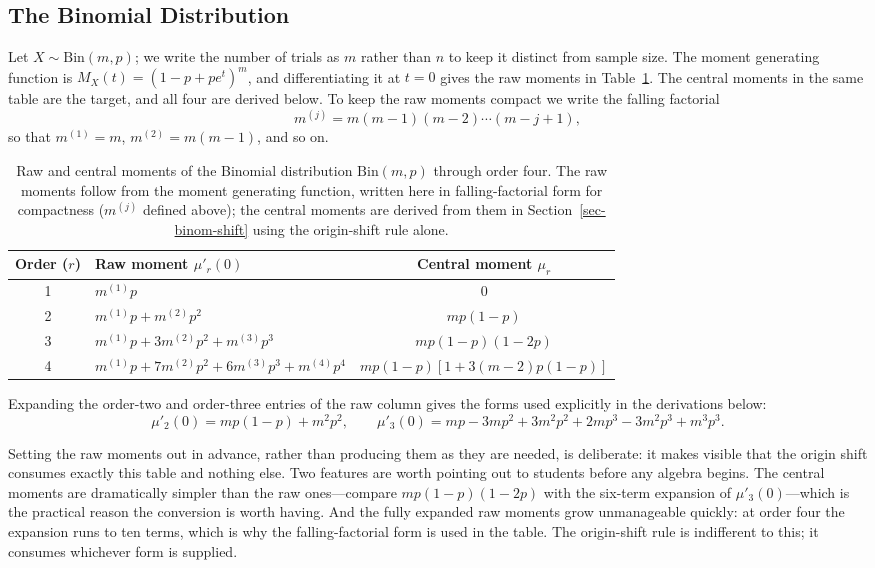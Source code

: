 \documentclass[
  12pt]{article}
\begin{document}
\subsection{The Binomial Distribution}

Let $X \sim \text{Bin}(m, p)$; we write the number of trials as $m$ rather than $n$ to keep it distinct from sample size. The moment generating function is $M_X(t) = \left(1 - p + p e^t\right)^m$, and differentiating it at $t = 0$ gives the raw moments in Table~\ref{tab:binom}. The central moments in the same table are the target, and all four are derived below. To keep the raw moments compact we write the falling factorial
\[
m^{(j)} = m(m-1)(m-2)\cdots(m-j+1),
\]
so that $m^{(1)} = m$, $m^{(2)} = m(m-1)$, and so on.

\begin{table}[htbp]
\centering
\small
\begin{tabular}{@{}clc@{}}
\toprule
Order ($r$) & Raw moment $\mu'_r(0)$ & Central moment $\mu_r$ \\
\midrule
1 & $m^{(1)}p$ & $0$ \\
2 & $m^{(1)}p + m^{(2)}p^2$ & $mp(1-p)$ \\
3 & $m^{(1)}p + 3m^{(2)}p^2 + m^{(3)}p^3$ & $mp(1-p)(1-2p)$ \\
4 & $m^{(1)}p + 7m^{(2)}p^2 + 6m^{(3)}p^3 + m^{(4)}p^4$ & $mp(1-p)\left[1 + 3(m-2)p(1-p)\right]$ \\
\bottomrule
\end{tabular}
\caption{Raw and central moments of the Binomial distribution $\text{Bin}(m,p)$ through order four. The raw moments follow from the moment generating function, written here in falling-factorial form for compactness ($m^{(j)}$ defined above); the central moments are derived from them in Section~\ref{sec-binom-shift} using the origin-shift rule alone.}
\label{tab:binom}
\end{table}

Expanding the order-two and order-three entries of the raw column gives the forms used explicitly in the derivations below:
\[
\mu'_2(0) = mp(1-p) + m^2p^2, \qquad
\mu'_3(0) = mp - 3mp^2 + 3m^2p^2 + 2mp^3 - 3m^2p^3 + m^3p^3 .
\]

Setting the raw moments out in advance, rather than producing them as they are needed, is deliberate: it makes visible that the origin shift consumes exactly this table and nothing else. Two features are worth pointing out to students before any algebra begins. The central moments are dramatically simpler than the raw ones---compare $mp(1-p)(1-2p)$ with the six-term expansion of $\mu'_3(0)$---which is the practical reason the conversion is worth having. And the fully expanded raw moments grow unmanageable quickly: at order four the expansion runs to ten terms, which is why the falling-factorial form is used in the table. The origin-shift rule is indifferent to this; it consumes whichever form is supplied.
\end{document}
